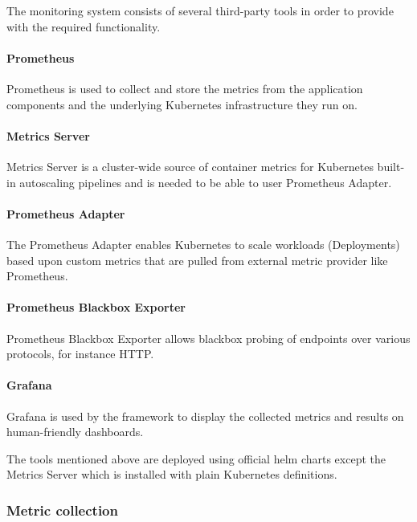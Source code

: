 The monitoring system consists of several third-party tools in order to provide with the required functionality.

\paragraph{Prometheus} Prometheus is used to collect and store the metrics from the application components and the underlying Kubernetes infrastructure they run on.

\paragraph{Metrics Server} Metrics Server is a cluster-wide source of container metrics for Kubernetes built-in autoscaling pipelines and is needed to be able to user Prometheus Adapter.

\paragraph{Prometheus Adapter} The Prometheus Adapter enables Kubernetes to scale workloads (\eg Deployments) based upon custom metrics that are pulled from external metric provider like Prometheus.

\paragraph{Prometheus Blackbox Exporter} Prometheus Blackbox Exporter allows blackbox probing of endpoints over various protocols, for instance HTTP.

\paragraph{Grafana} Grafana is used by the framework to display the collected metrics and results on human-friendly dashboards.

The tools mentioned above are deployed using official helm charts \cite{PrometheusChart} \cite{PrometheusAdapterChart} \cite{BlackboxExporterChart} \cite{GrafanaChart} except the Metrics Server which is installed with plain Kubernetes definitions. 

\subsubsection{Metric collection}

